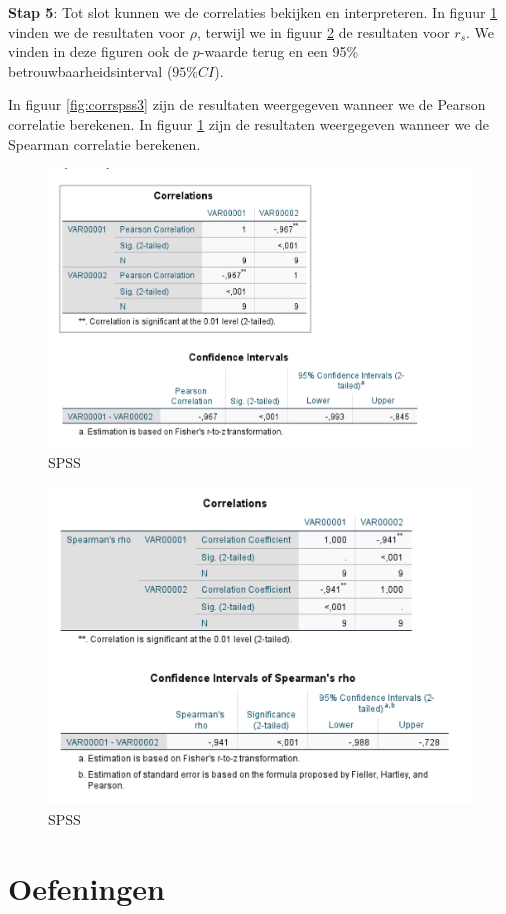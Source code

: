 \documentclass[
]{book}
\theoremstyle{definition}
\theoremstyle{definition}
\theoremstyle{definition}
\theoremstyle{definition}
\theoremstyle{remark}
\begin{document}
\textbf{Stap 5}: Tot slot kunnen we de correlaties bekijken en interpreteren. In figuur \ref{fig:corrspss4} vinden we de resultaten voor \(\rho\), terwijl we in figuur \ref{fig:corrspss5} de resultaten voor \(r_s\). We vinden in deze figuren ook de \(p\)-waarde terug en een 95\% betrouwbaarheidsinterval (\(95\% CI\)).

In figuur \ref{fig:corrspss3} zijn de resultaten weergegeven wanneer we de Pearson correlatie berekenen. In figuur \ref{fig:corrspss4} zijn de resultaten weergegeven wanneer we de Spearman correlatie berekenen.

\begin{figure}
\includegraphics[width=0.75\linewidth]{img/spss_corr_4} \caption{SPSS}\label{fig:corrspss4}
\end{figure}

\begin{figure}
\includegraphics[width=0.75\linewidth]{img/spss_corr_5} \caption{SPSS}\label{fig:corrspss5}
\end{figure}

\newpage

\hypertarget{oefeningen}{%
\section*{Oefeningen}\label{oefeningen}}
\end{document}
